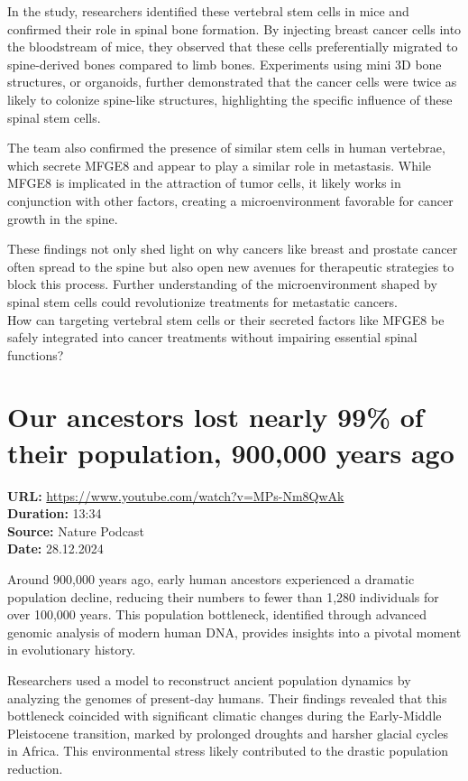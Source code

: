 \documentclass[12pt]{article}
\begin{document}
In the study, researchers identified these vertebral stem cells in mice and confirmed their role in spinal bone formation. By injecting breast cancer cells into the bloodstream of mice, they observed that these cells preferentially migrated to spine-derived bones compared to limb bones. Experiments using mini 3D bone structures, or organoids, further demonstrated that the cancer cells were twice as likely to colonize spine-like structures, highlighting the specific influence of these spinal stem cells.  

The team also confirmed the presence of similar stem cells in human vertebrae, which secrete MFGE8 and appear to play a similar role in metastasis. While MFGE8 is implicated in the attraction of tumor cells, it likely works in conjunction with other factors, creating a microenvironment favorable for cancer growth in the spine.  

These findings not only shed light on why cancers like breast and prostate cancer often spread to the spine but also open new avenues for therapeutic strategies to block this process. Further understanding of the microenvironment shaped by spinal stem cells could revolutionize treatments for metastatic cancers.\\[5px]  

How can targeting vertebral stem cells or their secreted factors like MFGE8 be safely integrated into cancer treatments without impairing essential spinal functions?  



\newpage

\section{Our ancestors lost nearly 99\% of their population, 900,000 years ago}
\textbf{URL:} \url{https://www.youtube.com/watch?v=MPs-Nm8QwAk}\\
\textbf{Duration:} 13:34\\
\textbf{Source:} Nature Podcast\\
\textbf{Date:} 28.12.2024


Around 900,000 years ago, early human ancestors experienced a dramatic population decline, reducing their numbers to fewer than 1,280 individuals for over 100,000 years. This population bottleneck, identified through advanced genomic analysis of modern human DNA, provides insights into a pivotal moment in evolutionary history.

Researchers used a model to reconstruct ancient population dynamics by analyzing the genomes of present-day humans. Their findings revealed that this bottleneck coincided with significant climatic changes during the Early-Middle Pleistocene transition, marked by prolonged droughts and harsher glacial cycles in Africa. This environmental stress likely contributed to the drastic population reduction.
\end{document}
